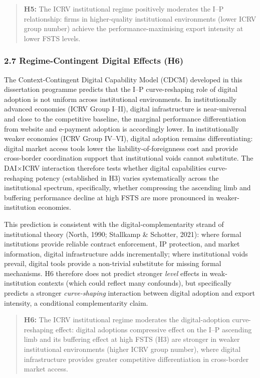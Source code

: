 \documentclass[12pt,a4paper]{article}
\begin{document}
\begin{quote}
\textbf{H5:} The ICRV institutional regime positively moderates the I--P
relationship: firms in higher-quality institutional environments (lower
ICRV group number) achieve the performance-maximising export intensity
at lower FSTS levels.
\end{quote}

\hypertarget{27-regime-contingent-digital-effects-h6}{%
\subsubsection{2.7 Regime-Contingent Digital Effects
(H6)}\label{27-regime-contingent-digital-effects-h6}}

The Context-Contingent Digital Capability Model (CDCM) developed in this
dissertation programme predicts that the I--P curve-reshaping role of
digital adoption is not uniform across institutional environments. In
institutionally advanced economies (ICRV Group I--II), digital
infrastructure is near-universal and close to the competitive baseline,
the marginal performance differentiation from website and e-payment
adoption is accordingly lower. In institutionally weaker economies (ICRV
Group IV--VI), digital adoption remains differentiating: digital market
access tools lower the liability-of-foreignness cost and provide
cross-border coordination support that institutional voids cannot
substitute. The DAI×ICRV interaction therefore tests whether digital
capabilities\textquotesingle{} curve-reshaping potency (established in
H3) varies systematically across the institutional spectrum,
specifically, whether compressing the ascending limb and buffering
performance decline at high FSTS are more pronounced in
weaker-institution economies.

This prediction is consistent with the digital-complementarity strand of
institutional theory (North, 1990; Stallkamp \& Schotter, 2021): where
formal institutions provide reliable contract enforcement, IP
protection, and market information, digital infrastructure adds
incrementally; where institutional voids prevail, digital tools provide
a non-trivial substitute for missing formal mechanisms. H6 therefore
does not predict stronger \emph{level} effects in weak-institution
contexts (which could reflect many confounds), but specifically predicts
a stronger \emph{curve-shaping} interaction between digital adoption and
export intensity, a conditional complementarity claim.

\begin{quote}
\textbf{H6:} The ICRV institutional regime moderates the
digital-adoption curve-reshaping effect: digital
adoption\textquotesingle s compressive effect on the I--P ascending limb
and its buffering effect at high FSTS (H3) are stronger in weaker
institutional environments (higher ICRV group number), where digital
infrastructure provides greater competitive differentiation in
cross-border market access.
\end{quote}
\end{document}
